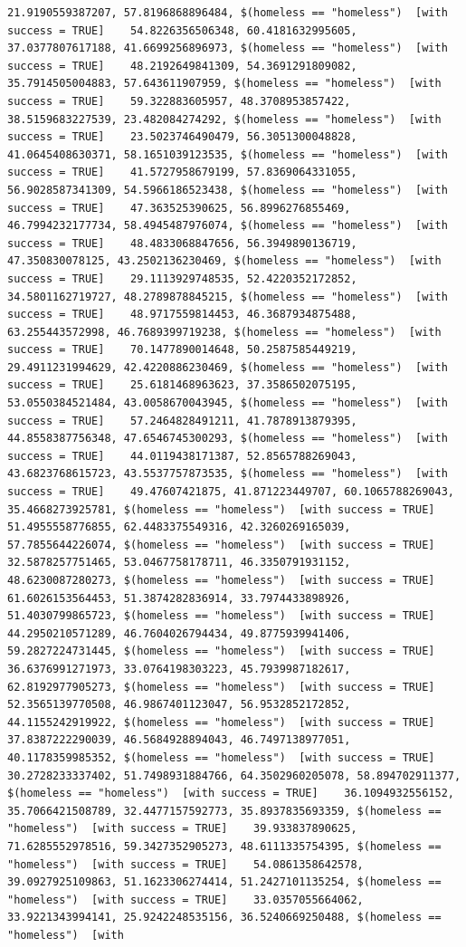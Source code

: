 \documentclass{tufte-book}\usepackage[]{graphicx}\usepackage[]{xcolor}
\makeatletter
\newenvironment{kframe}{%
 \def\at@end@of@kframe{}%
 \ifinner\ifhmode%
  \def\at@end@of@kframe{\end{minipage}}%
  \begin{minipage}{\columnwidth}%
 \fi\fi%
 \def\FrameCommand##1{\hskip\@totalleftmargin \hskip-\fboxsep
 \colorbox{shadecolor}{##1}\hskip-\fboxsep
     \hskip-\linewidth \hskip-\@totalleftmargin \hskip\columnwidth}%
 \MakeFramed {\advance\hsize-\width
   \@totalleftmargin\z@ \linewidth\hsize
   \@setminipage}}%
 {\par\unskip\endMakeFramed%
 \at@end@of@kframe}
\newenvironment{knitrout}{}{} %
\makeatother
\begin{document}
\begin{knitrout}
\begin{kframe}
\begin{verbatim}
21.9190559387207, 57.8196868896484, $(homeless == "homeless")  [with success = TRUE]    54.8226356506348, 60.4181632995605, 37.0377807617188, 41.6699256896973, $(homeless == "homeless")  [with success = TRUE]    48.2192649841309, 54.3691291809082, 35.7914505004883, 57.643611907959, $(homeless == "homeless")  [with success = TRUE]    59.322883605957, 48.3708953857422, 38.5159683227539, 23.482084274292, $(homeless == "homeless")  [with success = TRUE]    23.5023746490479, 56.3051300048828, 41.0645408630371, 58.1651039123535, $(homeless == "homeless")  [with success = TRUE]    41.5727958679199, 57.8369064331055, 56.9028587341309, 54.5966186523438, $(homeless == "homeless")  [with success = TRUE]    47.363525390625, 56.8996276855469, 46.7994232177734, 58.4945487976074, $(homeless == "homeless")  [with success = TRUE]    48.4833068847656, 56.3949890136719, 47.350830078125, 43.2502136230469, $(homeless == "homeless")  [with success = TRUE]    29.1113929748535, 52.4220352172852, 34.5801162719727, 48.2789878845215, $(homeless == "homeless")  [with success = TRUE]    48.9717559814453, 46.3687934875488, 63.255443572998, 46.7689399719238, $(homeless == "homeless")  [with success = TRUE]    70.1477890014648, 50.2587585449219, 29.4911231994629, 42.4220886230469, $(homeless == "homeless")  [with success = TRUE]    25.6181468963623, 37.3586502075195, 53.0550384521484, 43.0058670043945, $(homeless == "homeless")  [with success = TRUE]    57.2464828491211, 41.7878913879395, 44.8558387756348, 47.6546745300293, $(homeless == "homeless")  [with success = TRUE]    44.0119438171387, 52.8565788269043, 43.6823768615723, 43.5537757873535, $(homeless == "homeless")  [with success = TRUE]    49.47607421875, 41.871223449707, 60.1065788269043, 35.4668273925781, $(homeless == "homeless")  [with success = TRUE]    51.4955558776855, 62.4483375549316, 42.3260269165039, 57.7855644226074, $(homeless == "homeless")  [with success = TRUE]    32.5878257751465, 53.0467758178711, 46.3350791931152, 48.6230087280273, $(homeless == "homeless")  [with success = TRUE]    61.6026153564453, 51.3874282836914, 33.7974433898926, 51.4030799865723, $(homeless == "homeless")  [with success = TRUE]    44.2950210571289, 46.7604026794434, 49.8775939941406, 59.2827224731445, $(homeless == "homeless")  [with success = TRUE]    36.6376991271973, 33.0764198303223, 45.7939987182617, 62.8192977905273, $(homeless == "homeless")  [with success = TRUE]    52.3565139770508, 46.9867401123047, 56.9532852172852, 44.1155242919922, $(homeless == "homeless")  [with success = TRUE]    37.8387222290039, 46.5684928894043, 46.7497138977051, 40.1178359985352, $(homeless == "homeless")  [with success = TRUE]    30.2728233337402, 51.7498931884766, 64.3502960205078, 58.894702911377, $(homeless == "homeless")  [with success = TRUE]    36.1094932556152, 35.7066421508789, 32.4477157592773, 35.8937835693359, $(homeless == "homeless")  [with success = TRUE]    39.933837890625, 71.6285552978516, 59.3427352905273, 48.6111335754395, $(homeless == "homeless")  [with success = TRUE]    54.0861358642578, 39.0927925109863, 51.1623306274414, 51.2427101135254, $(homeless == "homeless")  [with success = TRUE]    33.0357055664062, 33.9221343994141, 25.9242248535156, 36.5240669250488, $(homeless == "homeless")  [with 
\end{verbatim}
\end{kframe}
\end{knitrout}
\end{document}
